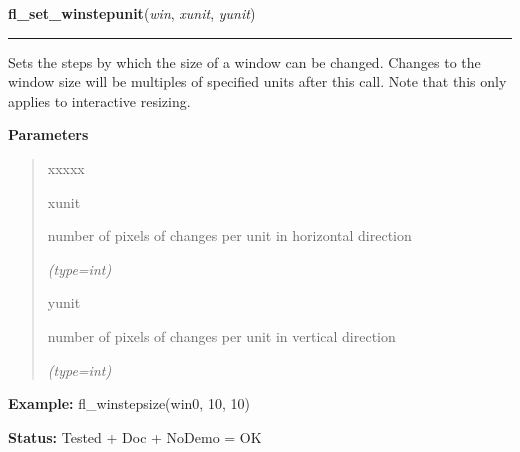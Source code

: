 \hspace{.8\funcindent}\begin{boxedminipage}{\funcwidth}

    \raggedright \textbf{fl\_set\_winstepunit}(\textit{win}, \textit{xunit}, \textit{yunit})

    \vspace{-1.5ex}

    \rule{\textwidth}{0.5\fboxrule}
\setlength{\parskip}{2ex}
    Sets the steps by which the size of a window can be changed. Changes to
    the window size will be multiples of specified units after this call. 
    Note that this only applies to interactive resizing.

\setlength{\parskip}{1ex}
      \textbf{Parameters}
      \vspace{-1ex}

      \begin{quote}
        \begin{Ventry}{xxxxx}

          \item[xunit]

          number of pixels of changes per unit in horizontal direction

            {\it (type=int)}

          \item[yunit]

          number of pixels of changes per unit in vertical direction

            {\it (type=int)}

        \end{Ventry}

      \end{quote}

\textbf{Example:} fl\_winstepsize(win0, 10, 10)



\textbf{Status:} Tested + Doc + NoDemo = OK



    \end{boxedminipage}

    \label{xformslib:flxbasic:fl_winisvalid}

    \vspace{0.5ex}


